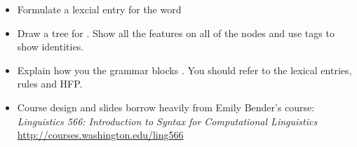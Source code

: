 \documentclass[a4paper,landscape,headrule,footrule]{foils}
\begin{document}
\begin{itemize}

\item Formulate a lexcial entry for the word 
  
\item Draw a tree for .  Show all the features on all of the nodes and use tags to show identities.

  \item Explain how you the grammar blocks .  You should refer to the lexical entries, rules and HFP.
  
\end{itemize}



\begin{itemize}
\item Course design and slides borrow heavily from Emily Bender's course:
\textit{Linguistics 566: Introduction to Syntax for Computational Linguistics}
\\ \url{http://courses.washington.edu/ling566}
\end{itemize}
\end{document}
